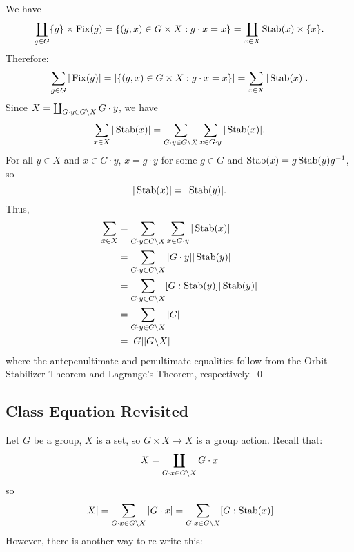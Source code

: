 \documentclass{article}
\renewenvironment{proof}{{\bfseries\color{blue1} Proof:}}{\qed}
\begin{document}
\begin{proof}
    We have
    \begin{equation*}
        \coprod_{g\in G}\{g\}\times \operatorname{Fix}(g) = \{(g,x)\in G\times X:g\cdot x=x\} = \coprod_{x\in X}\operatorname{Stab}(x) \times \{x\}.
    \end{equation*}
    Therefore:
    \begin{equation*}
        \sum_{g\in G}|\operatorname{Fix}(g)|=\left|\{(g,x)\in G\times X:g\cdot x=x\}\right|=\sum_{x\in X}|\operatorname{Stab}(x)|.
    \end{equation*}
    Since $X=\coprod_{G\cdot y \in G\text{\textbackslash} X} G\cdot y$, we have
    \begin{equation*}
        \sum_{x\in X}|\operatorname{Stab}(x)| = \sum_{G\cdot y\in G\text{\textbackslash} X}\sum_{x\in G\cdot y}|\operatorname{Stab}(x)|.
    \end{equation*}
    For all $y\in X$ and $x\in G\cdot y$, $x=g\cdot y$ for some $g\in G$ and $\operatorname{Stab}(x)=g\operatorname{Stab}(y)g^{-1}$, so
    \begin{equation*}
        |\operatorname{Stab}(x)|=|\operatorname{Stab}(y)|.
    \end{equation*}
    Thus,
    \begin{align*}
        \sum_{x\in X} & = \sum_{G\cdot y\in G\text{\textbackslash} X}\sum_{x\in G\cdot y}|\operatorname{Stab}(x)| \\
                      & = \sum_{G\cdot y\in G\text{\textbackslash} X}|G\cdot y| |\operatorname{Stab}(y)|          \\
                      & = \sum_{G\cdot y\in G\text{\textbackslash} X}[G:\operatorname{Stab}(y)]|\operatorname{Stab}(y)|         \\
                      & = \sum_{G\cdot y\in G\text{\textbackslash} X} |G|                           \\
                      & = |G||G\text{\textbackslash} X|
    \end{align*}
    where the antepenultimate and penultimate equalities follow from the Orbit-Stabilizer Theorem and Lagrange's Theorem, respectively.
\end{proof}
\subsection{Class Equation Revisited}
Let $G$ be a group, $X$ is a set, so $G\times X\rightarrow X$ is a group action. Recall that:
\begin{equation*}
    X = \coprod_{G\cdot x \in G \text{\textbackslash} X}G\cdot x
\end{equation*}
so
\begin{equation*}
    |X|=\sum_{G\cdot x \in G\text{\textbackslash} X}|G\cdot x| = \sum_{G\cdot x \in G\text{\textbackslash} X}[G:\operatorname{Stab}(x)]
\end{equation*}
However, there is another way to re-write this:
\end{document}
